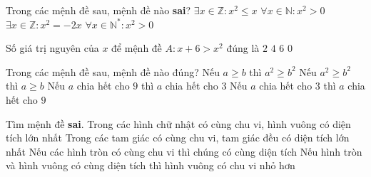 \begin{ex}%
	Trong các mệnh đề sau, mệnh đề nào \textbf{sai}? 
	\choice 
		{$\exists  x\in\mathbb{Z}:x^2\leq x$}
		 {\True $\forall x\in\mathbb{N}:x^2>0$}
		 {$\exists x\in\mathbb{Z}:x^2=-2x$}
		{$\forall x\in\mathbb{N^*}:x^2>0$} 
\end{ex}

\begin{ex}%
	Số giá trị nguyên của $x$ để mệnh đề $A\colon x+6>x^2$ đúng là 
	 \choice
		{$2$} 
		 {\True $4$}
		{$6$} 
		 {$0$}
\end{ex}

\begin{ex}%
	Trong các mệnh đề sau, mệnh đề nào đúng? 
	\choice 
		{Nếu  $a\ge b$ thì $a^2\ge b^2$}
		{Nếu $a^2 \ge b^2$ thì $a \ge  b$}
		{\True Nếu $a$ chia  hết cho $9$ thì $a$ chia hết cho $3$}
		{Nếu $a$ chia hết cho $3$ thì $a$ chia hết cho  $9$}
\end{ex}

\begin{ex}%
	 Tìm mệnh đề \textbf{sai}.
	 \choice
		{Trong các hình chữ nhật có cùng chu vi, hình  vuông có diện tích lớn nhất}
		{Trong  các tam giác có cùng chu vi, tam giác đều có diện tích lớn nhất}
		{Nếu các hình tròn có cùng chu vi thì chúng  có cùng diện tích}
		{\True Nếu hình tròn và hình vuông có cùng diện tích  thì hình vuông có chu vi nhỏ hơn}
\end{ex}

